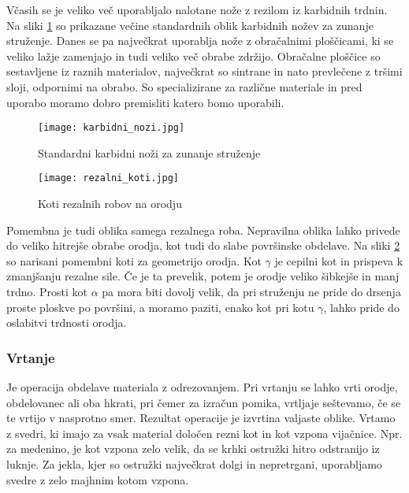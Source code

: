 Včasih se je veliko več uporabljalo nalotane nože z rezilom iz
karbidnih trdnin. Na sliki \ref{karbidni_nozi} so prikazane večine
standardnih oblik karbidnih nožev za zunanje struženje.
Danes se pa največkrat uporablja nože z obračalnimi ploščicami,
ki se veliko lažje zamenjajo in tudi veliko več obrabe zdržijo.
Obračalne ploščice so sestavljene iz raznih materialov, največkrat
so sintrane in nato prevlečene z tršimi sloji, odpornimi na obrabo.
So specializirane za različne materiale in pred uporabo moramo
dobro premisliti katero bomo uporabili.

\begin{figure}
	\begin{center}
		\texttt{[image: karbidni\_nozi.jpg]}
		\caption{Standardni karbidni noži za zunanje struženje
			\cite{sts_arhiv_struzenje_karbidni_nozi}}
		\label{karbidni_nozi}
	\end{center}
\end{figure}

\begin{figure}
	\begin{center}
		\texttt{[image: rezalni\_koti.jpg]}
		\caption{Koti rezalnih robov na orodju
			\cite{sts_arhiv_struzenje_rezalni_koti}}
		\label{rezalni_koti}
	\end{center}
\end{figure}

Pomembna je tudi oblika samega rezalnega roba. Nepravilna
oblika lahko privede do veliko hitrejše obrabe orodja, kot tudi
do slabe površinske obdelave. Na sliki \ref{rezalni_koti} so narisani
pomembni koti za geometrijo orodja. Kot \(\gamma\) je cepilni kot in prispeva
k zmanjšanju rezalne sile. Če je ta prevelik, potem je orodje veliko
šibkejše in manj trdno. Prosti kot \(\alpha\) pa mora biti dovolj velik,
da pri struženju ne pride do drsenja proste ploskve po površini, a
moramo paziti, enako kot pri kotu \(\gamma\), lahko pride do oslabitvi
trdnosti orodja.

\subsubsection{Vrtanje}
Je operacija obdelave materiala z odrezovanjem.
Pri vrtanju se lahko vrti orodje, obdelovanec ali oba hkrati,
pri čemer za izračun pomika, vrtljaje seštevamo, če se te vrtijo
v nasprotno smer. Rezultat operacije je izvrtina valjaste oblike.
Vrtamo z svedri, ki imajo za vsak material določen rezni kot in kot vzpona
vijačnice. Npr. za medenino, je kot vzpona zelo velik, da se
krhki ostružki hitro odstranijo iz luknje. Za jekla, kjer so
ostružki največkrat dolgi in nepretrgani, uporabljamo svedre z
zelo majhnim kotom vzpona.

